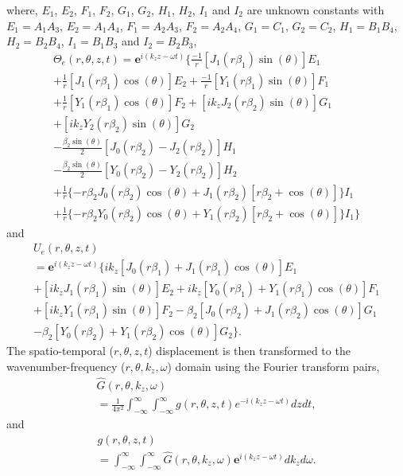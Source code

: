 \documentclass[twocolumn,10pt]{asme2ej}
\begin{document}
where, $E_1$, $E_2$, $F_1$, $F_2$, $G_1$, $G_2$, $H_1$, $H_2$, $I_1$ and $I_2$ are unknown constants with $E_1 = A_1A_3$, $E_2 = A_1A_4$, $F_1 = A_2A_3$, $F_2 = A_2A_4$, $G_1 = C_1$, $G_2 = C_2$, $H_1 = B_1B_4$, $H_2 = B_2B_4$, $I_1 = B_1B_3$ and $I_2 = B_2B_3$,
\begin{multline}
    \Theta_e(r,\theta,z,t) = \mathbf{e}^{i(k_{z}z-\omega t)}\bigg\{\frac{-1}{r}[J_1(r\beta_1)\sin(\theta)]E_1\\ + \frac{1}{r}[J_1(r\beta_1)\cos(\theta)]E_2 + \frac{-1}{r}[Y_1(r\beta_1)\sin(\theta)]F_1\\ + \frac{1}{r}[Y_1(r\beta_1)\cos(\theta)]F_2 + [ik_zJ_2(r\beta_2)\sin(\theta)]G_1\\ + [ik_zY_2(r\beta_2)\sin(\theta)]G_2\\ - \frac{\beta_2\sin(\theta)}{2}[J_0(r\beta_2)-J_2(r\beta_2)]H_1\\ - \frac{\beta_2\sin(\theta)}{2}[Y_0(r\beta_2)-Y_2(r\beta_2)]H_2\\ + \frac{1}{r}\{-r\beta_2J_0(r\beta_2)\cos(\theta) + J_1(r\beta_2)[r\beta_2+\cos(\theta)]\}I_1\\ + \frac{1}{r}\{-r\beta_2Y_0(r\beta_2)\cos(\theta) + Y_1(r\beta_2)[r\beta_2+\cos(\theta)]\}I_1\bigg\}
\end{multline}
and
\begin{multline}
    U_e(r,\theta,z,t)\\ = \mathbf{e}^{i(k_{z}z-\omega t)}\bigg\{ik_z[J_{0}(r\beta_1) + J_{1}(r\beta_1)\cos(\theta)]E_1\\ + [ik_zJ_{1}(r\beta_1)\sin(\theta)]E_2 +  ik_z[Y_{0}(r\beta_1) + Y_{1}(r\beta_1)\cos(\theta)]F_1\\ +[ik_zY_{1}(r\beta_1)\sin(\theta)]F_2 
    - \beta_2[J_{0}(r\beta_2) + J_{1}(r\beta_2)\cos(\theta)]G_1\\ - \beta_2[Y_{0}(r\beta_2) + Y_{1}(r\beta_2)\cos(\theta)]G_2\bigg\}.
\end{multline}
The spatio-temporal ($r, \theta, z, t$) displacement is then transformed to the wavenumber-frequency ($r, \theta, k_z, \omega$) domain using the Fourier transform pairs,
\begin{multline}\label{Forward fourier transform}
    \hat{G}(r,\theta,k_{z},\omega)\\ = \frac{1}{4\pi^{2}}\int^{\infty}_{-\infty}\int^{\infty}_{-\infty}g(r,\theta,z,t)e^{-i(k_{z}z-\omega t)}dzdt,
\end{multline}
and
\begin{multline}\label{Backward fourier transform}
    g(r,\theta,z,t)\\ = \int^{\infty}_{-\infty}\int^{\infty}_{-\infty}\hat{G}(r,\theta,k_{z},\omega)\mathbf{e}^{i(k_{z}z-\omega t)}dk_{z}d\omega.
\end{multline} 
\end{document}
